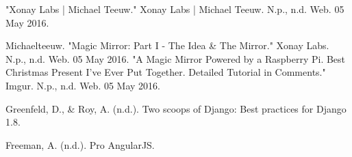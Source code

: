 \documentclass[conference]{IEEEtran}
\begin{document}

%
%
%
\begin{thebibliography}{1}

 "Xonay Labs | Michael Teeuw." Xonay Labs | Michael Teeuw. N.p., n.d. Web. 05 May 2016.

 Michaelteeuw. "Magic Mirror: Part I - The Idea & The Mirror." Xonay Labs. N.p., n.d. Web. 05 May 2016.
 "A Magic Mirror Powered by a Raspberry Pi. Best Christmas Present I've Ever Put Together. Detailed Tutorial in Comments." Imgur. N.p., n.d. Web. 05 May 2016.

 Greenfeld, D., & Roy, A. (n.d.). Two scoops of Django: Best practices for Django 1.8.

 Freeman, A. (n.d.). Pro AngularJS.


 \end{thebibliography}

 
\end{document}
